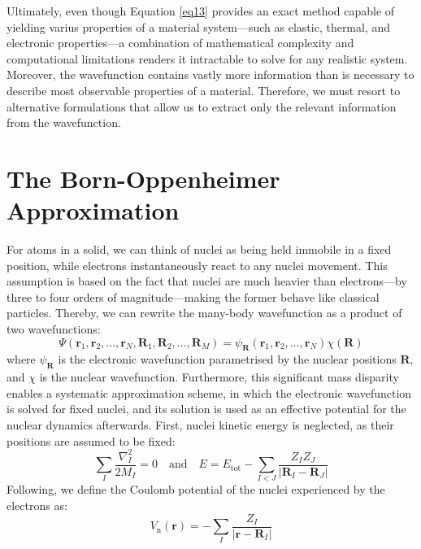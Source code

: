 Ultimately, even though Equation \ref{eq13} provides an exact method capable of yielding varius properties of a material system---such as elastic, thermal, and electronic properties---a combination of mathematical complexity and computational limitations renders it intractable to solve for any realistic system. Moreover, the wavefunction contains vastly more information than is necessary to describe most observable properties of a material. Therefore, we must resort to alternative formulations that allow us to extract only the relevant information from the wavefunction. 
\section{The Born-Oppenheimer Approximation}
For atoms in a solid, we can think of nuclei as being held immobile in a fixed position, while electrons instantaneously react to any nuclei movement. This assumption is based on the fact that nuclei are much heavier than electrons---by three to four orders of magnitude---making the former behave like classical particles. Thereby, we can rewrite the many-body wavefunction as a product of two wavefunctions:
\begin{equation}
  \Psi(\mathbf{r}_1, \mathbf{r}_2, \ldots, \mathbf{r}_N, \mathbf{R}_1, \mathbf{R}_2, \ldots, \mathbf{R}_M) = \psi_{\mathbf{R}}(\mathbf{r}_1, \mathbf{r}_2, \ldots, \mathbf{r}_N)\chi(\mathbf{R})
  \label{eq14}
\end{equation}
where $\psi_{\mathbf{R}}$ is the electronic wavefunction parametrised by the nuclear positions $\mathbf{R}$, and $\chi$ is the nuclear wavefunction. Furthermore, this significant mass disparity enables a systematic approximation scheme, in which the electronic wavefunction is solved for fixed nuclei, and its solution is used as an effective potential for the nuclear dynamics afterwards. First, nuclei kinetic energy is neglected, as their positions are assumed to be fixed: 
\begin{equation}
  \label{eq15}
  \sum_I \frac{\nabla_I^2}{2 M_I} = 0
  \quad \text{and} \quad  E = E_{\text{tot}} - \sum_{I<J} \frac{Z_I Z_J}{|\mathbf{R}_I - \mathbf{R}_J|}
\end{equation}
Following, we define the Coulomb potential of the nuclei experienced by the electrons as:
\begin{equation}
  \label{eq16}
  V_{\text{n}}(\mathbf{r}) = - \sum_{I} \frac{Z_I}{|\mathbf{r} - \mathbf{R}_I|}
\end{equation}
